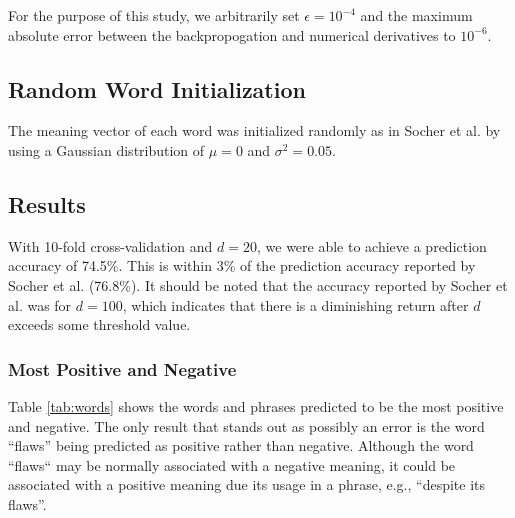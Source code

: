 \documentclass{article}
\begin{document}
For the purpose of this study, we arbitrarily set $\epsilon = 10^{-4}$ and the maximum absolute error between the backpropogation and numerical derivatives to $10^{-6}$. 


%
%
\subsection{Random Word Initialization}
The meaning vector of each word was initialized randomly as in Socher et al. by using a Gaussian distribution of $\mu = 0$ and $\sigma ^2 = 0.05$.


%
%
\subsection{Results}
With 10-fold cross-validation and $d=20$, we were able to achieve a prediction accuracy of 74.5\%. This is within 3\% of the prediction accuracy reported by Socher et al. (76.8\%). It should be noted that the accuracy reported by Socher et al. was for $d=100$, which indicates that there is a diminishing return after $d$ exceeds some threshold value.


\subsubsection{Most Positive and Negative}
Table \ref{tab:words} shows the words and phrases predicted to be the most positive and negative. The only result that stands out as possibly an error is the word ``flaws'' being predicted as positive rather than negative. Although the word ``flaws`` may be normally associated with a negative meaning, it could be associated with a positive meaning due its usage in a phrase, e.g., ``despite its flaws''.
\end{document}
